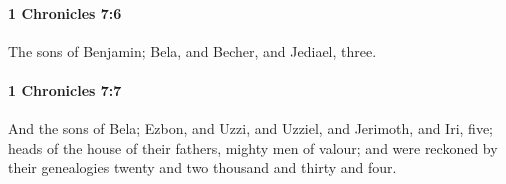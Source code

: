 		\paragraph{1 Chronicles 7:6} %
			\label{1CHRONICLES-7-6}

			The sons of Benjamin; Bela, and Becher, and Jediael, three.


		\paragraph{1 Chronicles 7:7} %
			\label{1CHRONICLES-7-7}

			And the sons of Bela; Ezbon, and Uzzi, and Uzziel, and Jerimoth, and Iri, five; heads of the house of their fathers, mighty men of valour; and were reckoned by their genealogies twenty and two thousand and thirty and four.


